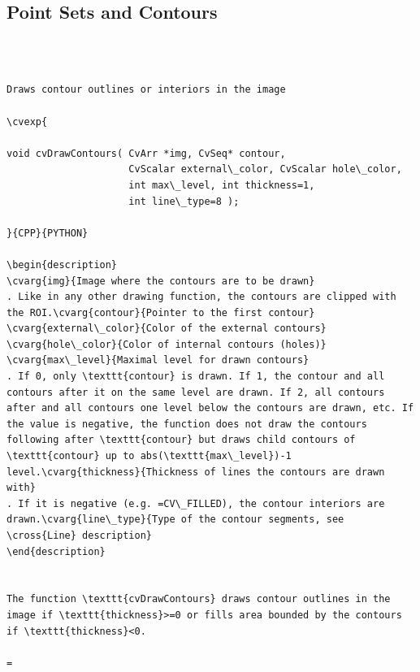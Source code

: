 \subsection{Point Sets and Contours}
\begin{verbatim}


\end{verbatim}
\label{DrawContours}
\begin{verbatim}

Draws contour outlines or interiors in the image

\cvexp{

void cvDrawContours( CvArr *img, CvSeq* contour,
                     CvScalar external\_color, CvScalar hole\_color,
                     int max\_level, int thickness=1,
                     int line\_type=8 );

}{CPP}{PYTHON}

\begin{description}
\cvarg{img}{Image where the contours are to be drawn}
. Like in any other drawing function, the contours are clipped with the ROI.\cvarg{contour}{Pointer to the first contour}
\cvarg{external\_color}{Color of the external contours}
\cvarg{hole\_color}{Color of internal contours (holes)}
\cvarg{max\_level}{Maximal level for drawn contours}
. If 0, only \texttt{contour} is drawn. If 1, the contour and all contours after it on the same level are drawn. If 2, all contours after and all contours one level below the contours are drawn, etc. If the value is negative, the function does not draw the contours following after \texttt{contour} but draws child contours of \texttt{contour} up to abs(\texttt{max\_level})-1 level.\cvarg{thickness}{Thickness of lines the contours are drawn with}
. If it is negative (e.g. =CV\_FILLED), the contour interiors are drawn.\cvarg{line\_type}{Type of the contour segments, see \cross{Line} description}
\end{description}


The function \texttt{cvDrawContours} draws contour outlines in the image if \texttt{thickness}>=0 or fills area bounded by the contours if \texttt{thickness}<0.

=\end{verbatim}
\label{Example. Connected component detection via contour functions}
